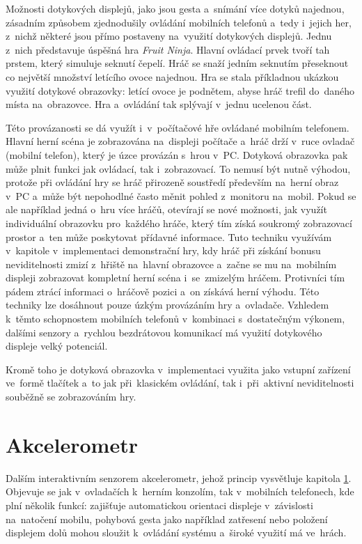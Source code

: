 \documentclass[thesis=B,czech,hidelinks]{FITthesis}[2012/06/26] %
\begin{document}
Možnosti dotykových displejů, jako jsou gesta a~snímání více dotyků najednou, zásadním způsobem zjednodušily ovládání mobilních telefonů a~tedy i~jejich her, z~nichž některé jsou přímo postaveny na~využití dotykových displejů. Jednu z~nich představuje úspěšná hra \textit{Fruit Ninja}\cite{fruitninja}.  Hlavní ovládací prvek tvoří tah prstem, který simuluje seknutí čepelí. Hráč se snaží jedním seknutím přeseknout co největší množství letícího ovoce najednou. Hra se stala příkladnou ukázkou využití dotykové obrazovky: letící ovoce je podnětem, abyse hráč trefil do~daného místa na~obrazovce. Hra a~ovládání tak splývají v~jednu ucelenou část.

Této provázanosti se dá využít i~v~počítačové hře ovládané mobilním telefonem. Hlavní herní scéna je zobrazována na~displeji počítače a~hráč drží v~ruce ovladač (mobilní telefon), který je úzce provázán s~hrou v~PC. Dotyková obrazovka pak může plnit funkci jak ovládací, tak i~zobrazovací. To nemusí být nutně výhodou, protože při ovládání hry se hráč přirozeně soustředí především na~herní obraz v~PC a~může být nepohodlné často měnit pohled z~monitoru na~mobil. Pokud se ale například jedná o~hru více hráčů, otevírají se nové možnosti, jak využít individuální obrazovku pro~každého hráče, který tím získá soukromý zobrazovací prostor a~ten může poskytovat přídavné informace. Tuto techniku využívám v~kapitole \cite{chapter:implementation} v~implementaci demonstrační hry, kdy hráč při získání bonusu neviditelnosti zmizí z~hřiště na~hlavní obrazovce a~začne se mu na~mobilním displeji zobrazovat kompletní herní scéna i~se~zmizelým hráčem. Protivníci tím pádem ztrácí informaci o~hráčově pozici a~on získává herní výhodu. Této techniky lze dosáhnout pouze úzkým provázáním hry a~ovladače. Vzhledem k~těmto schopnostem mobilních telefonů v~kombinaci s~dostatečným výkonem, dalšími senzory a~rychlou bezdrátovou komunikací má využití dotykového displeje velký potenciál.

Kromě toho je dotyková obrazovka v~implementaci využita jako vstupní zařízení ve~formě tlačítek a~to jak při~klasickém ovládání, tak i~při~aktivní neviditelnosti souběžně se zobrazováním hry.

\section{Akcelerometr}
\label{section:accelerometer}

Dalším interaktivním senzorem akcelerometr, jehož princip vysvětluje kapitola \ref{section:accelerometer}. Objevuje se jak v~ovladačích k~herním konzolím, tak v~mobilních telefonech, kde plní několik funkcí: zajišťuje automatickou orientaci displeje v~závislosti na~natočení mobilu, pohybová gesta jako například zatřesení nebo položení displejem dolů mohou sloužit k~ovládání systému a~široké využití má ve~hrách.
\end{document}
